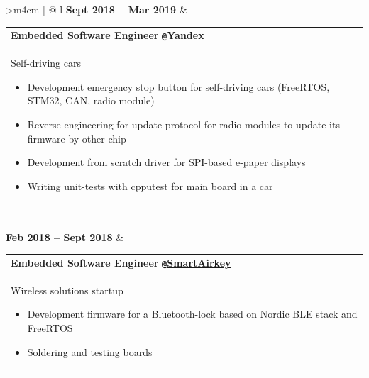 \documentclass{anisyan-resume}
\begin{document}
\begin{tabularx}{\textwidth}{>{\quad}m{4cm} | @{\timelinebullet} l}
		\normalsize\textbf{Sept 2018 -- Mar 2019}
		&
		\renewcommand\arraystretch{1}
		\begin{tabular}[t]{ p{15cm} }
			\large{\textbf{Embedded Software Engineer}} \texttt{\textbf{@}}\href{https://en.wikipedia.org/wiki/Yandex}{\textbf{Yandex}}\\
			\normalsize{Self-driving cars}
			\renewcommand\labelitemi{{\boldmath$\cdot$}}
			\begin{itemize}[noitemsep, topsep=5pt, parsep=0pt, partopsep=0pt]
				\item {\small Development emergency stop button for self-driving cars (FreeRTOS, STM32, CAN, radio module)}
				\item {\small Reverse engineering for update protocol for radio modules to update its firmware by other chip}
				\item {\small Development from scratch driver for SPI-based e-paper displays}
				\item {\small Writing unit-tests with cpputest for main board in a car}
			\end{itemize}
		\end{tabular} \\

		\normalsize\textbf{Feb 2018 -- Sept 2018}
		&
		\renewcommand\arraystretch{1}
		\begin{tabular}[t]{ p{15cm} }
			\large{\textbf{Embedded Software Engineer}} \texttt{\textbf{@}}\href{https://smartairkey.com/en/}{\textbf{SmartAirkey}}\\
			\normalsize{Wireless solutions startup}
			\renewcommand\labelitemi{{\boldmath$\cdot$}}
			\begin{itemize}[noitemsep, topsep=5pt, parsep=0pt, partopsep=0pt]
				\item {\small Development firmware for a Bluetooth-lock based on Nordic BLE stack and FreeRTOS}
				\item {\small Soldering and testing boards}
			\end{itemize}
		\end{tabular} \\

	\end{tabularx}

	\newpage 

	\vspace*{25pt}
	
\end{document}
